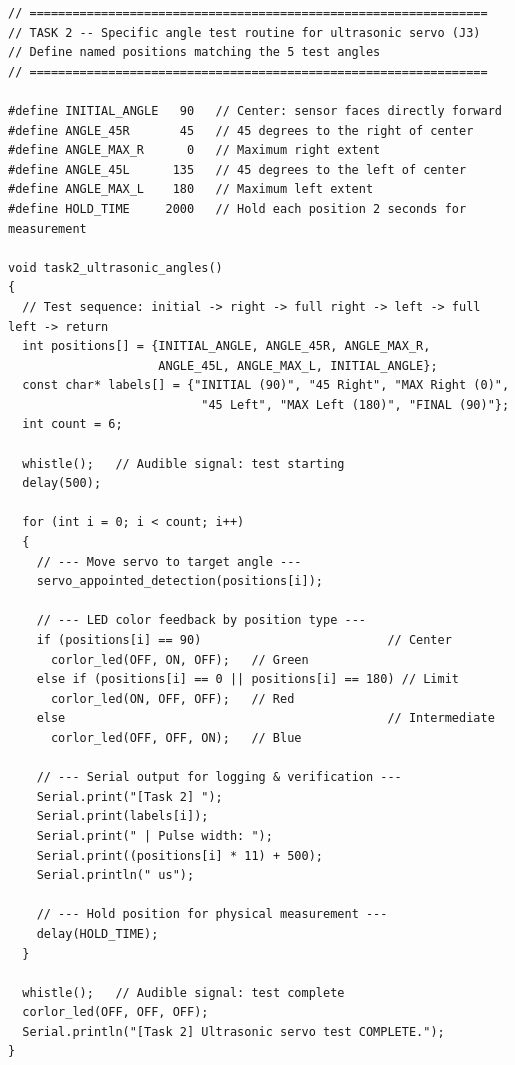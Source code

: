 \documentclass[12pt,a4paper]{article}
\begin{document}
\begin{lstlisting}[style=arduino,caption={Task 2 modification --- ultrasonic servo at specific angles}]
// ================================================================
// TASK 2 -- Specific angle test routine for ultrasonic servo (J3)
// Define named positions matching the 5 test angles
// ================================================================

#define INITIAL_ANGLE   90   // Center: sensor faces directly forward
#define ANGLE_45R       45   // 45 degrees to the right of center
#define ANGLE_MAX_R      0   // Maximum right extent
#define ANGLE_45L      135   // 45 degrees to the left of center
#define ANGLE_MAX_L    180   // Maximum left extent
#define HOLD_TIME     2000   // Hold each position 2 seconds for measurement

void task2_ultrasonic_angles()
{
  // Test sequence: initial -> right -> full right -> left -> full left -> return
  int positions[] = {INITIAL_ANGLE, ANGLE_45R, ANGLE_MAX_R,
                     ANGLE_45L, ANGLE_MAX_L, INITIAL_ANGLE};
  const char* labels[] = {"INITIAL (90)", "45 Right", "MAX Right (0)",
                           "45 Left", "MAX Left (180)", "FINAL (90)"};
  int count = 6;

  whistle();   // Audible signal: test starting
  delay(500);

  for (int i = 0; i < count; i++)
  {
    // --- Move servo to target angle ---
    servo_appointed_detection(positions[i]);

    // --- LED color feedback by position type ---
    if (positions[i] == 90)                          // Center
      corlor_led(OFF, ON, OFF);   // Green
    else if (positions[i] == 0 || positions[i] == 180) // Limit
      corlor_led(ON, OFF, OFF);   // Red
    else                                             // Intermediate
      corlor_led(OFF, OFF, ON);   // Blue

    // --- Serial output for logging & verification ---
    Serial.print("[Task 2] ");
    Serial.print(labels[i]);
    Serial.print(" | Pulse width: ");
    Serial.print((positions[i] * 11) + 500);
    Serial.println(" us");

    // --- Hold position for physical measurement ---
    delay(HOLD_TIME);
  }

  whistle();   // Audible signal: test complete
  corlor_led(OFF, OFF, OFF);
  Serial.println("[Task 2] Ultrasonic servo test COMPLETE.");
}
\end{lstlisting}
\end{document}
